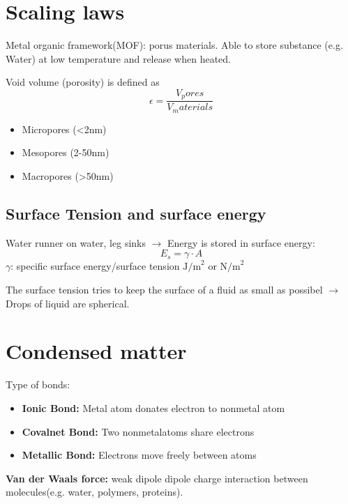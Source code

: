 \section{Scaling laws}


Metal organic framework(MOF): porus materials. Able to store substance (e.g. Water) at low temperature and release when heated.

Void volume (porosity) is defined as
\[
\epsilon = \frac{V_pores}{V_materials}
\]
\begin{itemize}
    \item Micropores (<2nm)
    \item Mesopores (2-50nm)
    \item Macropores (>50nm)
\end{itemize}
\subsection{Surface Tension and surface energy}
Water runner on water, leg sinks \(\rightarrow\) Energy is stored in surface energy:
\[
E_s = \gamma \cdot A
\]
\(\gamma\): specific surface energy/surface tension \(\text{J/m}^2\) or \(\text{N/m}^2\) 

The surface tension tries to keep the surface of a fluid as small as possibel \(\rightarrow\) Drops of liquid are spherical.

\section{Condensed matter}
Type of bonds:
\begin{itemize}
    \item \textbf{Ionic Bond:} Metal atom donates electron to nonmetal atom
    \item \textbf{Covalnet Bond:} Two nonmetalatoms share electrons
    \item \textbf{Metallic Bond:} Electrons move freely between atoms
\end{itemize}
\textbf{Van der Waals force:} weak dipole dipole charge interaction between molecules(e.g. water, polymers, proteins).

